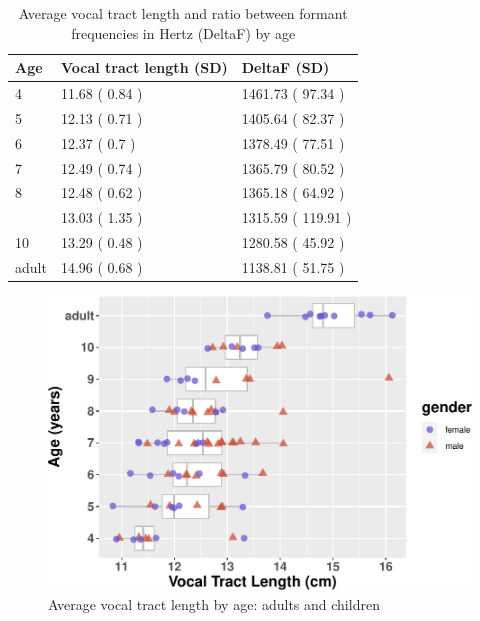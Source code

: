 \documentclass[
]{article}
\begin{document}
\begin{table}[!h]

\caption{\label{tab:vtl-length-table}Average vocal tract length and ratio between formant frequencies in Hertz (DeltaF) by age}
\centering
\begin{tabular}[t]{lll}
\toprule
Age & Vocal tract length (SD) & DeltaF (SD)\\
\midrule
4 & 11.68 ( 0.84 ) & 1461.73 ( 97.34 )\\
5 & 12.13 ( 0.71 ) & 1405.64 ( 82.37 )\\
6 & 12.37 ( 0.7 ) & 1378.49 ( 77.51 )\\
7 & 12.49 ( 0.74 ) & 1365.79 ( 80.52 )\\
8 & 12.48 ( 0.62 ) & 1365.18 ( 64.92 )\\
\addlinespace
9 & 13.03 ( 1.35 ) & 1315.59 ( 119.91 )\\
10 & 13.29 ( 0.48 ) & 1280.58 ( 45.92 )\\
adult & 14.96 ( 0.68 ) & 1138.81 ( 51.75 )\\
\bottomrule
\end{tabular}
\end{table}

\begin{figure}
\centering
\includegraphics{3_vtl_results_files/figure-latex/vtl-length-plot-1.pdf}
\caption{\label{fig:vtl-length-plot}Average vocal tract length
by age: adults and children}
\end{figure}
\end{document}
